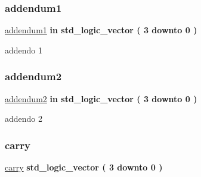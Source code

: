 \subsubsection{\texorpdfstring{addendum1}{addendum1}}
{\footnotesize\ttfamily \hyperlink{group___nibble_adder_ga2c8945f4747b9a5448412c95fc281c87}{addendum1} {\bfseries \textcolor{vhdlchar}{in}\textcolor{vhdlchar}{ }} {\bfseries \textcolor{vhdlchar}{std\+\_\+logic\+\_\+vector}\textcolor{vhdlchar}{ }\textcolor{vhdlchar}{(}\textcolor{vhdlchar}{ }\textcolor{vhdlchar}{ } \textcolor{vhdldigit}{3} \textcolor{vhdlchar}{ }\textcolor{vhdlchar}{downto}\textcolor{vhdlchar}{ }\textcolor{vhdlchar}{ } \textcolor{vhdldigit}{0} \textcolor{vhdlchar}{ }\textcolor{vhdlchar}{)}\textcolor{vhdlchar}{ }} \hspace{0.3cm}{\ttfamily [Port]}}



addendo 1 

\mbox{\label{group___nibble_adder_gad1fa6d9d78208885ad2f4c417fc4b530}} 
\subsubsection{\texorpdfstring{addendum2}{addendum2}}
{\footnotesize\ttfamily \hyperlink{group___nibble_adder_gad1fa6d9d78208885ad2f4c417fc4b530}{addendum2} {\bfseries \textcolor{vhdlchar}{in}\textcolor{vhdlchar}{ }} {\bfseries \textcolor{vhdlchar}{std\+\_\+logic\+\_\+vector}\textcolor{vhdlchar}{ }\textcolor{vhdlchar}{(}\textcolor{vhdlchar}{ }\textcolor{vhdlchar}{ } \textcolor{vhdldigit}{3} \textcolor{vhdlchar}{ }\textcolor{vhdlchar}{downto}\textcolor{vhdlchar}{ }\textcolor{vhdlchar}{ } \textcolor{vhdldigit}{0} \textcolor{vhdlchar}{ }\textcolor{vhdlchar}{)}\textcolor{vhdlchar}{ }} \hspace{0.3cm}{\ttfamily [Port]}}



addendo 2 

\mbox{\label{group___nibble_adder_ga8f5524d80e551d479327a16bb32abcaa}} 
\subsubsection{\texorpdfstring{carry}{carry}}
{\footnotesize\ttfamily \hyperlink{group___nibble_adder_ga8f5524d80e551d479327a16bb32abcaa}{carry} {\bfseries \textcolor{vhdlchar}{std\+\_\+logic\+\_\+vector}\textcolor{vhdlchar}{ }\textcolor{vhdlchar}{(}\textcolor{vhdlchar}{ }\textcolor{vhdlchar}{ } \textcolor{vhdldigit}{3} \textcolor{vhdlchar}{ }\textcolor{vhdlchar}{downto}\textcolor{vhdlchar}{ }\textcolor{vhdlchar}{ } \textcolor{vhdldigit}{0} \textcolor{vhdlchar}{ }\textcolor{vhdlchar}{)}\textcolor{vhdlchar}{ }} \hspace{0.3cm}{\ttfamily [Signal]}}

